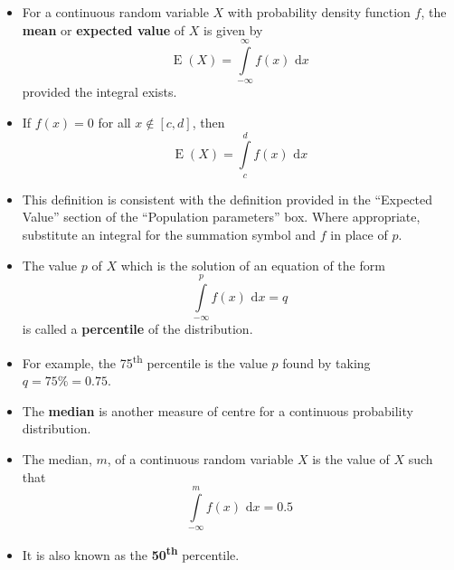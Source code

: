 \documentclass[12pt,a4paper,titlepage]{article}
\DeclareMathOperator{\E}{E}
\newcommand{\intd}[1]{\text{ d}#1}
\begin{document}
            \begin{SummaryBox}[title=Properties for a continuous probability distribution, breakable]
                \begin{SummaryExtensionBox}[title=Expected value/mean]
                    \begin{itemize}[leftmargin=*]
                        \item For a continuous random variable $X$ with probability density function $f$, the \textbf{mean} or \textbf{expected value} of $X$ is given by
                        \[
                            \E(X) = \int\limits_{-\infty}^\infty f(x)\intd{x}
                        \]
                        provided the integral exists.
                        \item If $f(x) = 0$ for all $x \notin [c,d]$, then
                        \[
                            \E(X) = \int\limits_c^d f(x)\intd{x}
                        \]
                        \item This definition is consistent with the definition provided in the ``Expected Value'' section of the ``Population parameters'' box. Where appropriate, substitute an integral for the summation symbol and $f$ in place of $p$.
                    \end{itemize}
                \end{SummaryExtensionBox}
                
                \begin{SummaryExtensionBox}[title=Percentiles]
                    \begin{itemize}[leftmargin=*]
                        \item The value $p$ of $X$ which is the solution of an equation of the form
                        \[
                            \int\limits_{-\infty}^p f(x)\intd{x} = q
                        \]
                        is called a \textbf{percentile} of the distribution.
                        \item For example, the 75\textsuperscript{th} percentile is the value $p$ found by taking $q = 75\% = 0.75$.
                    \end{itemize}
                \end{SummaryExtensionBox}
                
                \begin{SummaryExtensionBox}[title=The median]
                    \begin{itemize}[leftmargin=*]
                        \item The \textbf{median} is another measure of centre for a continuous probability distribution.
                        \item The median, $m$, of a continuous random variable $X$ is the value of $X$ such that
                        \[
                            \int\limits_{-\infty}^m f(x)\intd{x} = 0.5
                        \]
                        \item It is also known as the \textbf{50\textsuperscript{th}} percentile.
                    \end{itemize}
                \end{SummaryExtensionBox}
                

\end{SummaryBox}
\end{document}
